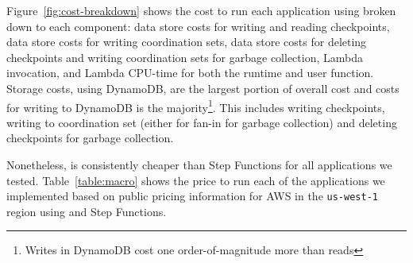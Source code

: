Figure~\ref{fig:cost-breakdown} shows the cost to run each application using
\name{} broken down to each component: data store costs for writing and
reading checkpoints, data store costs for writing coordination sets, data
store costs for deleting checkpoints and writing coordination sets for garbage
collection, Lambda invocation, and Lambda CPU-time for both the \name{}
runtime and user function. Storage costs, using DynamoDB, are the largest
portion of overall cost and costs for writing to DynamoDB is the
majority\footnote{Writes in DynamoDB cost one order-of-magnitude more than
reads}. This includes writing checkpoints, writing to coordination set (either
for fan-in for garbage collection) and deleting checkpoints for garbage
collection.

Nonetheless, \name{} is consistently cheaper than Step Functions for all
applications we tested. Table~\ref{table:macro} shows the price to run each of
the applications we implemented based on public pricing information for AWS in
the \texttt{us-west-1} region using \name{} and Step Functions.


%
%

